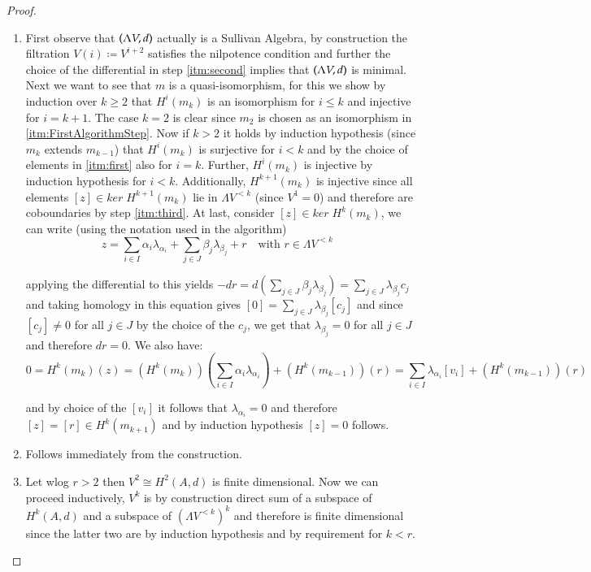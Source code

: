 \begin{proof}
\begin{enumerate}
 \item 

 First observe that $(\Lambda V,d)$ actually is a Sullivan Algebra, by construction the filtration $V(i) \coloneqq V^{i+2}$ satisfies
 the nilpotence condition and further the choice of the differential in step \ref{itm:second} implies that $(\Lambda V,d)$ is minimal.
 Next we want to see that $m$ is a quasi-isomorphism, for this we show by induction over $k \geq 2$ that
 $H^i(m_k)$ is an isomorphism for $i \leq k$ and injective for $ i = k +1$. The case $k = 2$ is clear since $m_2$ is chosen
 as an isomorphism in \ref{itm:FirstAlgorithmStep}. Now if $k > 2$ it holds by induction hypothesis (since $m_k$ extends
 $m_{k-1}$) that $H^i(m_k)$ is surjective for $i < k$ and by the choice of elements in \ref{itm:first} also for $i = k$.
 Further, $H^i(m_k)$ is injective by induction hypothesis for $i < k$. Additionally, $H^{k+1}(m_k)$ is injective since
 all elements $[z] \in ker \; H^{k+1}(m_k)$ lie in $\Lambda V^{<k}$ (since $V^1 = 0$) and therefore are
 coboundaries by step \ref{itm:third}. At last, consider $[z] \in ker \; H^k (m_k)$, we can write (using the notation used in
 the algorithm)
 $$z = \sum_{i \in I} \alpha_i \lambda_{\alpha_i} + \sum_{j \in J} \beta_j \lambda_{\beta_j} 
 + r \quad \text{with $r \in \Lambda V^{<k}$ }$$
 
 applying the differential to this yields
 $ -dr = d(\sum_{j \in J} \beta_j \lambda_{\beta_j}) = \sum_{j \in J} \lambda_{\beta_j} c_j$
 and taking homology in this equation gives $ [0] = \sum_{j \in J} \lambda_{\beta_j} [c_j]$ and since
 $[c_j] \neq 0$ for all $j \in J$ by the choice of the $c_j$, we get that $\lambda_{\beta_j} = 0$ for all $j \in J$ and 
 therefore $dr = 0$. We also have:
 $$0 = H^{k}(m_k)(z) = (H^k(m_k))( \sum_{i \in I} \alpha_i \lambda_{\alpha_i} ) + (H^k(m_{k-1}))(r)
    = \sum_{i \in I} \lambda_{\alpha_i} [v_i] + (H^k(m_{k-1}))(r) $$
    
and by choice of the $[v_i]$ it follows that $\lambda_{\alpha_i} = 0$ and therefore 
$ [z] = [r] \in H^k ( m_{k+1})$ and by induction hypothesis $[z] = 0$ follows.

 \item Follows immediately from the construction.
 \item Let wlog $r > 2$ then $V^2 \cong H^2(A,d)$ is finite dimensional. Now we can proceed inductively, $V^k$ is by construction 
 direct sum of a subspace of $H^k(A,d)$ and a subspace of $(\Lambda V^{ <k })^k$ and therefore is finite dimensional since
 the latter two are by induction hypothesis and by requirement for $k<r$.
 \end{enumerate}
\end{proof}


